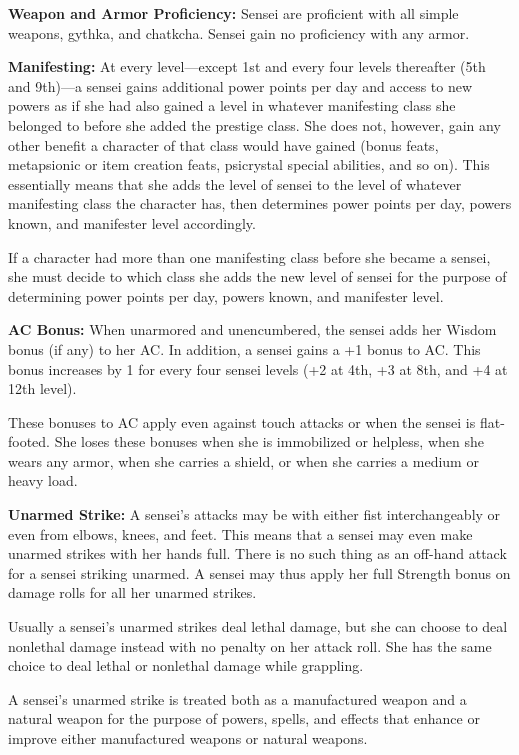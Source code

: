 {
\textbf{Weapon and Armor Proficiency:} Sensei are proficient with all simple weapons, gythka, and chatkcha. Sensei gain no proficiency with any armor.

\textbf{Manifesting:} At every level---except 1st and every four levels thereafter (5th and 9th)---a sensei gains additional power points per day and access to new powers as if she had also gained a level in whatever manifesting class she belonged to before she added the prestige class. She does not, however, gain any other benefit a character of that class would have gained (bonus feats, metapsionic or item creation feats, psicrystal special abilities, and so on). This essentially means that she adds the level of sensei to the level of whatever manifesting class the character has, then determines power points per day, powers known, and manifester level accordingly.

If a character had more than one manifesting class before she became a sensei, she must decide to which class she adds the new level of sensei for the purpose of determining power points per day, powers known, and manifester level.

\textbf{AC Bonus:} When unarmored and unencumbered, the sensei adds her Wisdom bonus (if any) to her AC. In addition, a sensei gains a +1 bonus to AC. This bonus increases by 1 for every four sensei levels (+2 at 4th, +3 at 8th, and +4 at 12th level).

These bonuses to AC apply even against touch attacks or when the sensei is flat-footed. She loses these bonuses when she is immobilized or helpless, when she wears any armor, when she carries a shield, or when she carries a medium or heavy load.

\textbf{Unarmed Strike:} A sensei's attacks may be with either fist interchangeably or even from elbows, knees, and feet. This means that a sensei may even make unarmed strikes with her hands full. There is no such thing as an off-hand attack for a sensei striking unarmed. A sensei may thus apply her full Strength bonus on damage rolls for all her unarmed strikes.

Usually a sensei's unarmed strikes deal lethal damage, but she can choose to deal nonlethal damage instead with no penalty on her attack roll. She has the same choice to deal lethal or nonlethal damage while grappling.

A sensei's unarmed strike is treated both as a manufactured weapon and a natural weapon for the purpose of powers, spells, and effects that enhance or improve either manufactured weapons or natural weapons.

}
